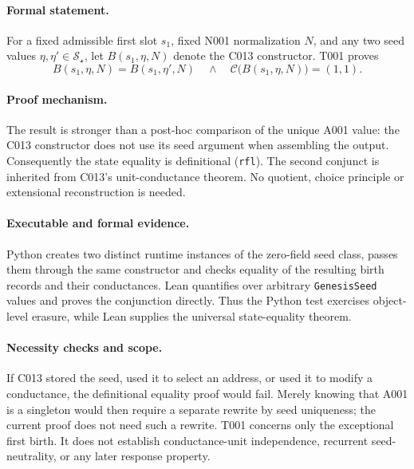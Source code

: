 
\paragraph*{Formal statement.}
For a fixed admissible first slot $s_1$, fixed N001 normalization $N$, and any
two seed values $\eta,\eta'\in\mathcal S_\star$, let
$B(s_1,\eta,N)$ denote the C013 constructor.  T001 proves
\begin{equation}
  B(s_1,\eta,N)=B(s_1,\eta',N)
  \quad\land\quad
  \mathcal C\bigl(B(s_1,\eta,N)\bigr)=(1,1).
  \label{eq:t001-seed-neutrality}
\end{equation}

\paragraph*{Proof mechanism.}
The result is stronger than a post-hoc comparison of the unique A001 value:
the C013 constructor does not use its seed argument when assembling the output.
Consequently the state equality is definitional (\texttt{rfl}).  The second
conjunct is inherited from C013's unit-conductance theorem.  No quotient,
choice principle or extensional reconstruction is needed.

\paragraph*{Executable and formal evidence.}
Python creates two distinct runtime instances of the zero-field seed class,
passes them through the same constructor and checks equality of the resulting
birth records and their conductances.  Lean quantifies over arbitrary
\texttt{GenesisSeed} values and proves the conjunction directly.  Thus the
Python test exercises object-level erasure, while Lean supplies the universal
state-equality theorem.

\paragraph*{Necessity checks and scope.}
If C013 stored the seed, used it to select an address, or used it to modify a
conductance, the definitional equality proof would fail.  Merely knowing that
A001 is a singleton would then require a separate rewrite by seed uniqueness;
the current proof does not need such a rewrite.  T001 concerns only the
exceptional first birth.  It does not establish conductance-unit independence,
recurrent seed-neutrality, or any later response property.

